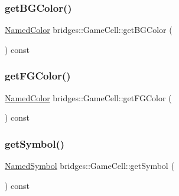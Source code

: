\subsubsection{\texorpdfstring{getBGColor()}{getBGColor()}}
{\footnotesize\ttfamily \mbox{\hyperlink{namespacebridges_ad811207d8898a7fd6b72a74725e68357}{Named\+Color}} bridges\+::\+Game\+Cell\+::get\+B\+G\+Color (\begin{DoxyParamCaption}{ }\end{DoxyParamCaption}) const\hspace{0.3cm}{\ttfamily [inline]}}

\mbox{\label{classbridges_1_1_game_cell_af33d2a831608968e4c2dd53692aafac8}} 
\subsubsection{\texorpdfstring{getFGColor()}{getFGColor()}}
{\footnotesize\ttfamily \mbox{\hyperlink{namespacebridges_ad811207d8898a7fd6b72a74725e68357}{Named\+Color}} bridges\+::\+Game\+Cell\+::get\+F\+G\+Color (\begin{DoxyParamCaption}{ }\end{DoxyParamCaption}) const\hspace{0.3cm}{\ttfamily [inline]}}

\mbox{\label{classbridges_1_1_game_cell_af6bb157599096b8149a69b227414becb}} 
\subsubsection{\texorpdfstring{getSymbol()}{getSymbol()}}
{\footnotesize\ttfamily \mbox{\hyperlink{namespacebridges_acfb0a4f7877d8f63de3e6862004c50ed}{Named\+Symbol}} bridges\+::\+Game\+Cell\+::get\+Symbol (\begin{DoxyParamCaption}{ }\end{DoxyParamCaption}) const\hspace{0.3cm}{\ttfamily [inline]}}

\mbox{\label{classbridges_1_1_game_cell_a9fcc58283b9f6fb770f27ae30233afe6}} 
